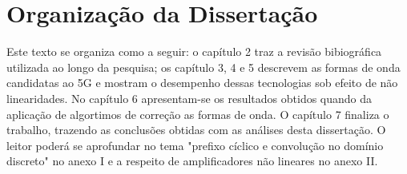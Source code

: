  \section{Organização da Dissertação}
 
Este texto se organiza como a seguir: o capítulo 2 traz a revisão bibiográfica utilizada ao longo da pesquisa; os capítulo 3, 4 e 5 descrevem as formas de onda candidatas ao 5G e mostram o desempenho dessas tecnologias sob efeito de não linearidades. No capítulo 6 apresentam-se os resultados obtidos quando da aplicação de algortimos de correção as formas de onda. O capítulo 7 finaliza o trabalho, trazendo as conclusões obtidas com as análises desta dissertação. O leitor poderá se aprofundar no tema "prefixo cíclico e convolução no domínio discreto" no anexo I e a respeito de amplificadores não lineares no anexo II. 

